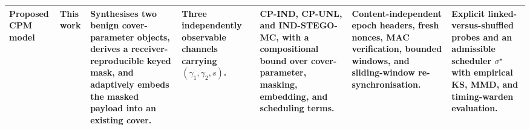 \documentclass[pdflatex,sn-mathphys-num]{sn-jnl}%
\theoremstyle{definition}
\theoremstyle{game}
\theoremstyle{thmstyleone}%
\theoremstyle{thmstyletwo}%
\theoremstyle{thmstylethree}%
\begin{document}
\begin{table}
\begin{tabularx}{0.98\textheight}{
@{}
L{0.82}
L{1.00}
L{1.13}
L{0.85}
L{1.10}
L{1.05}
L{1.05}
@{}}
\textbf{Proposed CPM model} &
\textbf{This work} &
Synthesises two benign cover-parameter objects, derives a
receiver-reproducible keyed mask, and adaptively embeds the masked
payload into an existing cover. &
Three independently observable channels carrying
$(\gamma_1,\gamma_2,s)$. &
\textsf{CP-IND}, \textsf{CP-UNL}, and
\textsf{IND-STEGO-MC}, with a compositional bound over
cover-parameter, masking, embedding, and scheduling terms. &
Content-independent epoch headers, fresh nonces, MAC
verification, bounded windows, and sliding-window
re-synchronisation. &
Explicit linked-versus-shuffled probes and an admissible
scheduler $\sigma^\star$ with empirical KS, MMD, and
timing-warden evaluation. \\

\bottomrule
\end{tabularx}
\end{table}
\end{document}
